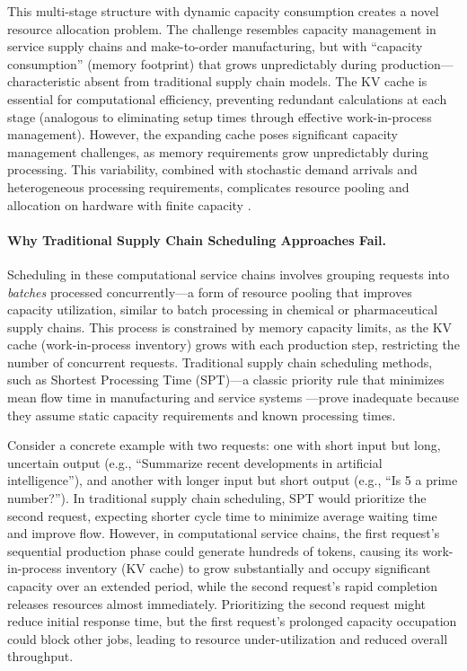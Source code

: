 \documentclass[poms,final,blindrev]{poms1_V1} %
\begin{document}
This multi-stage structure with dynamic capacity consumption creates a novel resource allocation problem. The challenge resembles capacity management in service supply chains and make-to-order manufacturing, but with ``capacity consumption'' (memory footprint) that grows unpredictably during production—characteristic absent from traditional supply chain models. The KV cache is essential for computational efficiency, preventing redundant calculations at each stage (analogous to eliminating setup times through effective work-in-process management). However, the expanding cache poses significant capacity management challenges, as memory requirements grow unpredictably during processing. This variability, combined with stochastic demand arrivals and heterogeneous processing requirements, complicates resource pooling and allocation on hardware with finite capacity \citep{tay2022efficient, kang2024gear, hooper2025kvquant}.

\paragraph{Why Traditional Supply Chain Scheduling Approaches Fail.}
Scheduling in these computational service chains involves grouping requests into \textit{batches} processed concurrently—a form of resource pooling that improves capacity utilization, similar to batch processing in chemical or pharmaceutical supply chains. This process is constrained by memory capacity limits, as the KV cache (work-in-process inventory) grows with each production step, restricting the number of concurrent requests. Traditional supply chain scheduling methods, such as Shortest Processing Time (SPT)—a classic priority rule that minimizes mean flow time in manufacturing and service systems \citep{conway1967theory}—prove inadequate because they assume static capacity requirements and known processing times.

Consider a concrete example with two requests: one with short input but long, uncertain output (e.g., ``Summarize recent developments in artificial intelligence''), and another with longer input but short output (e.g., ``Is 5 a prime number?''). In traditional supply chain scheduling, SPT would prioritize the second request, expecting shorter cycle time to minimize average waiting time and improve flow. However, in computational service chains, the first request's sequential production phase could generate hundreds of tokens, causing its work-in-process inventory (KV cache) to grow substantially and occupy significant capacity over an extended period, while the second request's rapid completion releases resources almost immediately. Prioritizing the second request might reduce initial response time, but the first request's prolonged capacity occupation could block other jobs, leading to resource under-utilization and reduced overall throughput.
\end{document}
